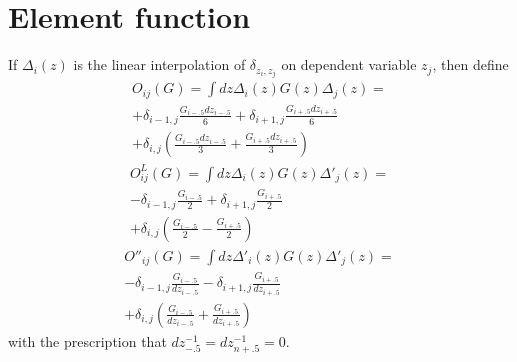 \documentclass{article}
\begin{document}
\section{Element function}
If $\Delta_i(z)$ is the linear interpolation of $\delta_{z_i, z_j}$ on dependent variable $z_j$, then define
\begin{multline*}
  O_{ij}(G)=\int dz \Delta_i(z)G(z)\Delta_j(z)=\\
  +\delta_{i-1, j}\frac{G_{i-.5}dz_{i-.5}}{6}
    +\delta_{i+1, j}\frac{G_{i+.5}dz_{i+.5}}{6}\\
    +\delta_{i  , j}\left(\frac{G_{i-.5}dz_{i-.5}}{3}+\frac{G_{i+.5}dz_{i+.5}}{3}\right)
\end{multline*}
\begin{multline*}
  O^L_{ij}(G)=\int dz \Delta_i(z)G(z)\Delta'_j(z)=\\
  -\delta_{i-1, j}\frac{G_{i-.5}}{2}
  +\delta_{i+1, j}\frac{G_{i+.5}}{2}\\
  +\delta_{i, j}\left(\frac{G_{i-.5}}{2}-\frac{G_{i+.5}}{2}\right)
\end{multline*}
\begin{multline*}
  O''_{ij}(G)=\int dz \Delta'_i(z)G(z)\Delta'_j(z)=\\
  -\delta_{i-1, j}\frac{G_{i-.5}}{dz_{i-.5}}
  -\delta_{i+1, j}\frac{G_{i+.5}}{dz_{i+.5}}\\
  +\delta_{i  , j}\left(\frac{G_{i-.5}}{dz_{i-.5}}+\frac{G_{i+.5}}{dz_{i+.5}}\right)
\end{multline*}
with the prescription that $dz^{-1}_{-.5}=dz^{-1}_{n+.5}=0$.

%  
  
\end{document}
